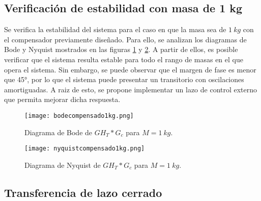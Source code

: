 \subsection{Verificación de estabilidad con masa de 1 kg}


\noindent Se verifica la estabilidad del sistema  para el caso en que la masa sea de $1\:kg$ con el compensador previamente diseñado. Para ello, se analizan los diagramas de Bode y Nyquist mostrados en las figuras \ref{fig:bode-analog-para-M-1Kg} y \ref{fig:nyquist-analog-para-M-1Kg}. A partir de ellos, es posible verificar que el sistema resulta estable para todo el rango de masas en el que opera el sistema. Sin embargo, se puede observar que el margen de fase es menor que 45°, por lo que el sistema puede presentar un transitorio con oscilaciones amortiguadas. A raiz de esto, se propone implementar un lazo de control externo que permita mejorar dicha respuesta.

\begin{figure}[H]
	\centering
	\texttt{[image: bodecompensado1kg.png]}
	\caption{Diagrama de Bode de $GH_T*G_c$ para $M=1\:kg$.}
	\label{fig:bode-analog-para-M-1Kg}
\end{figure}


\begin{figure}[H]
	\centering
	\texttt{[image: nyquistcompensado1kg.png]}
	\caption{Diagrama de Nyquist de $GH_T*G_c$ para $M=1\:kg$.}
	\label{fig:nyquist-analog-para-M-1Kg}
\end{figure}


\subsection{Transferencia de lazo cerrado}


